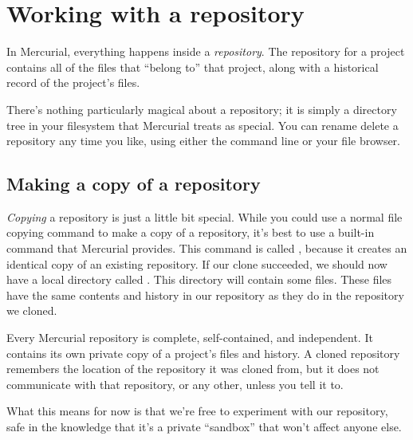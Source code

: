 \section{Working with a repository}

In Mercurial, everything happens inside a \emph{repository}.  The
repository for a project contains all of the files that ``belong to''
that project, along with a historical record of the project's files.

There's nothing particularly magical about a repository; it is simply
a directory tree in your filesystem that Mercurial treats as special.
You can rename delete a repository any time you like, using either the
command line or your file browser.

\subsection{Making a copy of a repository}

\emph{Copying} a repository is just a little bit special.  While you
could use a normal file copying command to make a copy of a
repository, it's best to use a built-in command that Mercurial
provides.  This command is called , because it creates an
identical copy of an existing repository.
If our clone succeeded, we should now have a local directory called
.  This directory will contain some files.
These files have the same contents and history in our repository as
they do in the repository we cloned.

Every Mercurial repository is complete, self-contained, and
independent.  It contains its own private copy of a project's files
and history.  A cloned repository remembers the location of the
repository it was cloned from, but it does not communicate with that
repository, or any other, unless you tell it to.

What this means for now is that we're free to experiment with our
repository, safe in the knowledge that it's a private ``sandbox'' that
won't affect anyone else.

